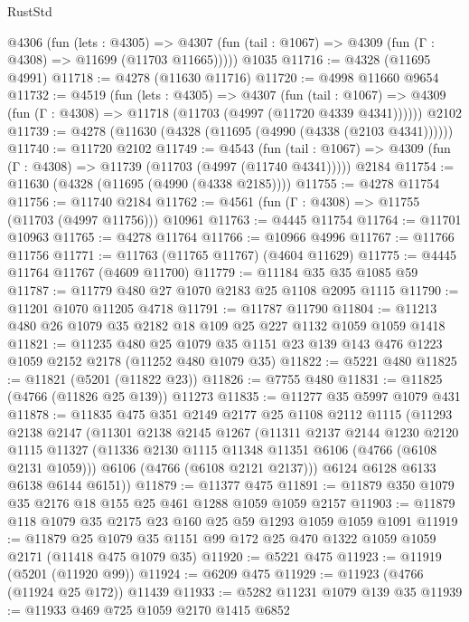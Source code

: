 \begin{lexlean}{RustStd}
\begin{coremodule}
{\begin{coremodule}
{{{{{{{{{{{{{{{{{{{{{{{{{{{{{{{{{{{    @4306
      (fun (lets : @4305) =>
      @4307 (fun (tail : @1067) => @4309 (fun (Γ : @4308) => @11699 (@11703 @11665)))))
    @1035
@11716 := @4328 (@11695 @4991)
@11718 := @4278 (@11630 @11716)
@11720 := @4998 @11660 @9654
@11732 := @4519
    (fun (lets : @4305) =>
    @4307
      (fun (tail : @1067) =>
      @4309 (fun (Γ : @4308) => @11718 (@11703 (@4997 (@11720 @4339 @4341))))))
    @2102
@11739 := @4278 (@11630 (@4328 (@11695 (@4990 (@4338 (@2103 @4341))))))
@11740 := @11720 @2102
@11749 := @4543
    (fun (tail : @1067) => @4309 (fun (Γ : @4308) => @11739 (@11703 (@4997 (@11740 @4341)))))
    @2184
@11754 := @11630 (@4328 (@11695 (@4990 (@4338 @2185))))
@11755 := @4278 @11754
@11756 := @11740 @2184
@11762 := @4561 (fun (Γ : @4308) => @11755 (@11703 (@4997 @11756))) @10961
@11763 := @4445 @11754
@11764 := @11701 @10963
@11765 := @4278 @11764
@11766 := @10966 @4996
@11767 := @11766 @11756
@11771 := @11763 (@11765 @11767) (@4604 @11629)
@11775 := @4445 @11764 @11767 (@4609 @11700)
@11779 := @11184 @35 @35 @1085 @59
@11787 := @11779 @480 @27 @1070 @2183 @25 @1108 @2095 @1115
@11790 := @11201 @1070 @11205 @4718
@11791 := @11787 @11790
@11804 := @11213 @480 @26 @1079 @35 @2182 @18 @109 @25 @227 @1132 @1059 @1059 @1418
@11821 := @11235
    @480
    @25
    @1079
    @35
    @1151
    @23
    @139
    @143
    @476
    @1223
    @1059
    @2152
    @2178
    (@11252 @480 @1079 @35)
@11822 := @5221 @480
@11825 := @11821 (@5201 (@11822 @23))
@11826 := @7755 @480
@11831 := @11825 (@4766 (@11826 @25 @139)) @11273
@11835 := @11277 @35 @5997 @1079 @431
@11878 := @11835
    @475
    @351
    @2149
    @2177
    @25
    @1108
    @2112
    @1115
    (@11293
      @2138
      @2147
      (@11301
        @2138
        @2145
        @1267
        (@11311
          @2137
          @2144
          @1230
          @2120
          @1115
          @11327
          (@11336 @2130 @1115 @11348 @11351 @6106 (@4766 (@6108 @2131 @1059)))
          @6106
          (@4766 (@6108 @2121 @2137)))
        @6124
        @6128
        @6133
        @6138
        @6144
        @6151))
@11879 := @11377 @475
@11891 := @11879 @350 @1079 @35 @2176 @18 @155 @25 @461 @1288 @1059 @1059 @2157
@11903 := @11879 @118 @1079 @35 @2175 @23 @160 @25 @59 @1293 @1059 @1059 @1091
@11919 := @11879
    @25
    @1079
    @35
    @1151
    @99
    @172
    @25
    @470
    @1322
    @1059
    @1059
    @2171
    (@11418 @475 @1079 @35)
@11920 := @5221 @475
@11923 := @11919 (@5201 (@11920 @99))
@11924 := @6209 @475
@11929 := @11923 (@4766 (@11924 @25 @172)) @11439
@11933 := @5282 @11231 @1079 @139 @35
@11939 := @11933 @469 @725 @1059 @2170 @1415 @6852
}}}}}}}}}}}}}}}}}}}}}}}}}}}}}}}}}}}
\end{coremodule}}
\end{coremodule}
\end{lexlean}
